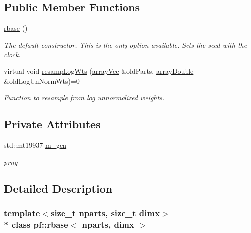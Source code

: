 \subsection*{Public Member Functions}
\begin{DoxyCompactItemize}
\item 
\hyperlink{classpf_1_1rbase_af43b8b8246426cd4f69a73784763bf95}{rbase} ()\hypertarget{classpf_1_1rbase_af43b8b8246426cd4f69a73784763bf95}{}\label{classpf_1_1rbase_af43b8b8246426cd4f69a73784763bf95}

\begin{DoxyCompactList}\small\item\em The default constructor. This is the only option available. Sets the seed with the clock. \end{DoxyCompactList}\item 
virtual void \hyperlink{classpf_1_1rbase_a0d8136638281a96a8c01b07393af9fc8}{resamp\+Log\+Wts} (\hyperlink{classpf_1_1rbase_a89951bb3872c1c6a0c3da0962a9aaa13}{array\+Vec} \&old\+Parts, \hyperlink{classpf_1_1rbase_a37b2d02d00f75d9550122b763cbb3fed}{array\+Double} \&old\+Log\+Un\+Norm\+Wts)=0
\begin{DoxyCompactList}\small\item\em Function to resample from log unnormalized weights. \end{DoxyCompactList}\end{DoxyCompactItemize}
\subsection*{Private Attributes}
\begin{DoxyCompactItemize}
\item 
std\+::mt19937 \hyperlink{classpf_1_1rbase_ad526b252f1ee84fc24b6ace422c1b482}{m\+\_\+gen}\hypertarget{classpf_1_1rbase_ad526b252f1ee84fc24b6ace422c1b482}{}\label{classpf_1_1rbase_ad526b252f1ee84fc24b6ace422c1b482}

\begin{DoxyCompactList}\small\item\em prng \end{DoxyCompactList}\end{DoxyCompactItemize}


\subsection{Detailed Description}
\subsubsection*{template$<$size\+\_\+t nparts, size\+\_\+t dimx$>$\\*
class pf\+::rbase$<$ nparts, dimx $>$}

